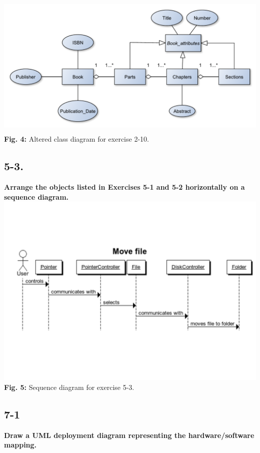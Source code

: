 \documentclass[12pt]{article}
\begin{document}
\includegraphics[height=70mm]{2-10}\\
\textbf{Fig. 4:} Altered class diagram for exercise 2-10.



\newpage
\subsection{5-3.}
\textbf{Arrange the objects listed in Exercises 5-1 and 5-2 horizontally on a sequence diagram.}\\
\includegraphics[scale=0.5]{5-3}\\
\textbf{Fig. 5:} Sequence diagram for exercise 5-3.



\newpage
\subsection{7-1}
\textbf{Draw a UML deployment diagram representing the hardware/software mapping.}\\
\end{document}
